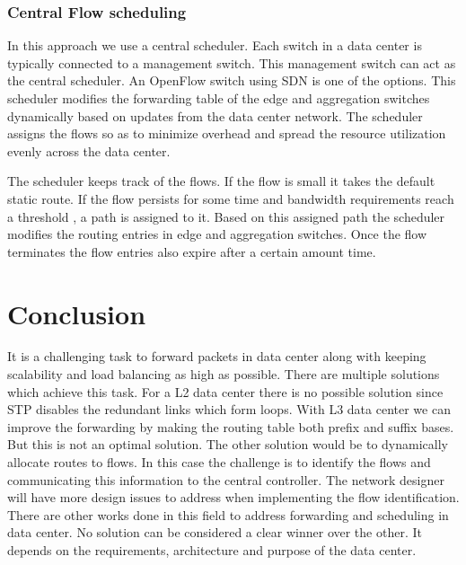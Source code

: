 \documentclass[11pt,letterpaper,onecolumn]{article}
\begin{document}
\subsubsection{Central Flow scheduling}
\par{\qquad In this approach we use a central scheduler. Each switch in a data center is typically connected to a management switch. This management switch can act as the central scheduler. An OpenFlow switch using SDN is one of the options. This scheduler modifies the forwarding table of the edge and aggregation switches dynamically based on updates from the data center network. The scheduler assigns the flows so as to minimize overhead and spread the resource utilization evenly across the data center.}\\

\par{The scheduler keeps track of the flows. If the flow is small it takes the default static route. If the flow persists for some time and bandwidth requirements reach a threshold , a path is assigned to it. Based on this assigned path the scheduler modifies the routing entries in edge and aggregation switches. Once the flow terminates the flow entries also expire after a certain amount time.}\\

\newpage

\section{Conclusion}
\par{\qquad It is a challenging task to forward packets in data center along with keeping scalability and load balancing as high as possible. There are multiple solutions which achieve this task. For a L2 data center there is no possible solution since STP disables the redundant links which form loops. With L3 data center we can improve the forwarding by making the routing table both prefix and suffix bases. But this is not an optimal solution. The other solution would be to dynamically allocate routes to flows. In this case the challenge is to identify the flows and communicating this information to the central controller. The network designer will have more design issues to address when implementing the flow identification. There are other works done in this field to address forwarding and scheduling in data center. No solution can be considered a clear winner over the other. It depends on the requirements, architecture and purpose of the data center. }\\


\RaggedRight
\newpage


\end{document}
